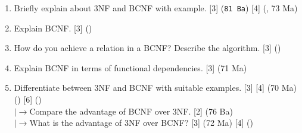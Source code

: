 \documentclass[12pt]{article}
\newcommand{\lb}{\\$\left|\rightarrow\right.$}
\begin{document}
\begin{enumerate}[noitemsep, topsep = 0pt]
        \item Briefly explain about 3NF and BCNF with example. \hfill [3] (\texttt{81 Ba}) [4] (, 73 Ma)
        
        \item Explain BCNF. \hfill [3] ()
        
        \item How do you achieve a relation in a BCNF? Describe the algorithm. \hfill [3] ()
        
        \item Explain BCNF in terms of functional dependencies. \hfill [3] (71 Ma)
        
        \item Differentiate between 3NF and BCNF with suitable examples. \hfill [3] [4] (70 Ma)() [6] ()
        \lb Compare the advantage of BCNF over 3NF. \hfill [2] (76 Ba)
        \lb What is the advantage of 3NF over BCNF? \hfill [3] (72 Ma) [4] ()
    \end{enumerate}

    \pagebreak
\end{document}
